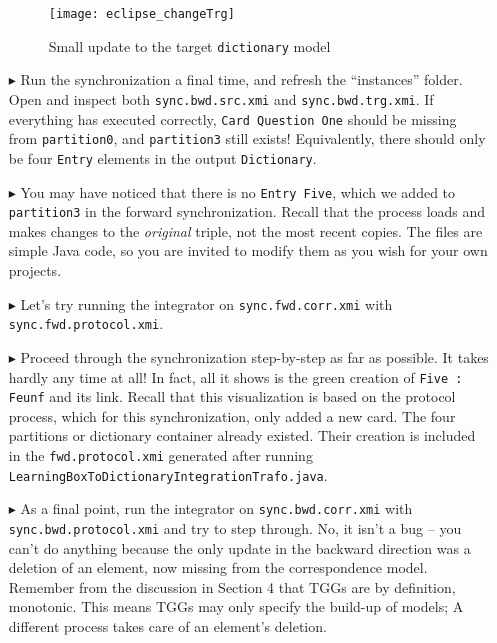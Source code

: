 \begin{itemize}
\newpage

\begin{figure}[htbp]
\begin{center}
  \texttt{[image: eclipse\_changeTrg]}
  \caption{Small update to the target \texttt{dictionary} model}
  \label{eclipse:changeTrg}
\end{center}
\end{figure}

\item[$\blacktriangleright$] Run the synchronization a final time, and refresh the ``instances'' folder. Open and inspect both \texttt{sync.bwd.src.xmi} and
\texttt{sync.\-bwd.\-trg.\-xmi}. If everything has executed correctly, \texttt{Card Question One} should be missing from \texttt{partition0}, and
\texttt{partition3} still exists! Equivalently, there should only be four \texttt{Entry} elements in the output \texttt{Dict\-ion\-ar\-y}.

\item[$\blacktriangleright$] You may have noticed that there is no \texttt{Entry Five}, which we added to \texttt{partition3} in the forward
synchronization. Recall that the process loads and makes changes to the \emph{original} triple, not the most recent copies. The files are simple Java code, so
you are invited to modify them as you wish for your own projects.

\item[$\blacktriangleright$] Let's try running the integrator on \texttt{sync.fwd.corr.xmi} with \texttt{sync.\-fwd.\-prot\-o\-col.\-xmi}.

\item[$\blacktriangleright$] Proceed through the synchronization step-by-step as far as possible. It takes hardly any time at all! In fact, all it shows is the
green creation of \texttt{Five : Feunf} and its link. Recall that this visualization is based on the protocol process, which for this synchronization, only
added a new card. The four partitions or dictionary container already existed. Their creation is included in the \texttt{fwd.protocol.xmi} generated
after running \texttt{LearningBoxToDictionaryIntegrationTrafo.java}.

\item[$\blacktriangleright$] As a final point, run the integrator on \texttt{sync.bwd.corr.xmi} with \texttt{sync.\-bwd.\-pro\-to\-col.\-xmi} and try to step
through. No, it isn't a bug -- you can't do anything because the only update in the backward direction was a deletion of an element, now missing from the
correspondence model. Remember from the discussion in Section 4 that TGGs are by definition, monotonic. This means TGGs may only specify the build-up of models; A different
process takes care of an element's deletion.

\end{itemize}

